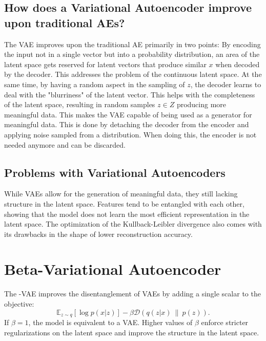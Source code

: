 \documentclass[a4paper]{IEEEtran}
\begin{document}
\subsection{How does a Variational Autoencoder improve upon traditional AEs?}
The VAE improves upon the traditional AE primarily in two points:
By encoding the input not in a single vector but into a probability distribution, an area of the latent space gets reserved for latent vectors that produce similar $x$ when decoded by the decoder. This addresses the problem of the continuous latent space. At the same time, by having a random aspect in the sampling of $z$, the decoder learns to deal with the "blurriness" of the latent vector. This helps with the completeness of the latent space, resulting in random samples $z \in Z$ producing more meaningful data. This makes the VAE capable of being used as a generator for meaningful data. This is done by detaching the decoder from the encoder and applying noise sampled from a distribution. When doing this, the encoder is not needed anymore and can be discarded.

\subsection{Problems with Variational Autoencoders}
While VAEs allow for the generation of meaningful data, they still lacking structure in the latent space. Features tend to be entangled with each other, showing that the model does not learn the most efficient representation in the latent space. The optimization of the Kullback-Leibler divergence also comes with its drawbacks in the shape of lower reconstruction accuracy. 

\section{Beta-Variational Autoencoder}
The \textbeta -VAE improves the disentanglement of VAEs by adding a single scalar to the objective:
\begin{equation}
	\mathbb{E}_{z \sim q}\left[ \log p(x|z) \right] - \beta \mathcal{D}(q(z|x) \ \| \ p(z)).
\end{equation}
If $\beta = 1$, the model is equivalent to a VAE. Higher values of $\beta$ enforce stricter regularizations on the latent space and improve the structure in the latent space. 
\end{document}
